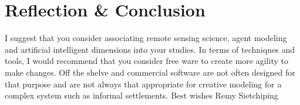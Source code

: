 
\chapter{Reflection \& Conclusion} %
\label{Chapter5} %
I suggest that you consider associating remote sensing science, agent modeling  and artificial intelligent dimensions into your studies. In terms of techniques and tools, I would recommend that you consider free ware to create more agility to make changes. Off the shelve and commercial software are not often designed for that purpose and are not always that appropriate for creative modeling for a complex system such as informal settlements. 
Best wishes
Remy Sietchiping